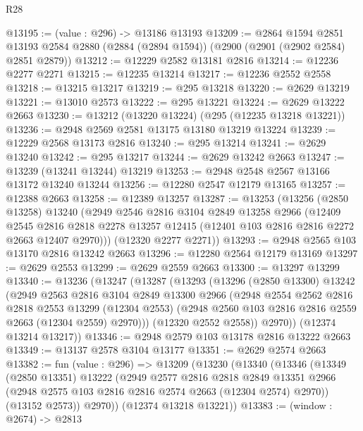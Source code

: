 \begin{lexlean}{R28}
\begin{coremodule}
@13195 := (value : @296) -> @13186 @13193
@13209 := @2864
    @1594
    @2851
    @13193
    @2584
    @2880
    (@2884 (@2894 @1594))
    (@2900 (@2901 (@2902 @2584) @2851 @2879))
@13212 := @12229 @2582 @13181 @2816
@13214 := @12236 @2277 @2271
@13215 := @12235 @13214
@13217 := @12236 @2552 @2558
@13218 := @13215 @13217
@13219 := @295 @13218
@13220 := @2629 @13219
@13221 := @13010 @2573
@13222 := @295 @13221
@13224 := @2629 @13222 @2663
@13230 := @13212 (@13220 @13224) (@295 (@12235 @13218 @13221))
@13236 := @2948 @2569 @2581 @13175 @13180 @13219 @13224
@13239 := @12229 @2568 @13173 @2816
@13240 := @295 @13214
@13241 := @2629 @13240
@13242 := @295 @13217
@13244 := @2629 @13242 @2663
@13247 := @13239 (@13241 @13244) @13219
@13253 := @2948 @2548 @2567 @13166 @13172 @13240 @13244
@13256 := @12280 @2547 @12179 @13165
@13257 := @12388 @2663
@13258 := @12389 @13257
@13287 := @13253
    (@13256
      (@2850 @13258)
      @13240
      (@2949
        @2546
        @2816
        @3104
        @2849
        @13258
        @2966
        (@12409
          @2545
          @2816
          @2818
          @2278
          @13257
          @12415
          (@12401 @103 @2816 @2816 @2272 @2663 @12407 @2970)))
      (@12320 @2277 @2271))
@13293 := @2948 @2565 @103 @13170 @2816 @13242 @2663
@13296 := @12280 @2564 @12179 @13169
@13297 := @2629 @2553
@13299 := @2629 @2559 @2663
@13300 := @13297 @13299
@13340 := @13236
    (@13247
      (@13287
        (@13293
          (@13296
            (@2850 @13300)
            @13242
            (@2949
              @2563
              @2816
              @3104
              @2849
              @13300
              @2966
              (@2948
                @2554
                @2562
                @2816
                @2818
                @2553
                @13299
                (@12304 @2553)
                (@2948 @2560 @103 @2816 @2816 @2559 @2663 (@12304 @2559) @2970)))
            (@12320 @2552 @2558))
          @2970))
      (@12374 @13214 @13217))
@13346 := @2948 @2579 @103 @13178 @2816 @13222 @2663
@13349 := @13137 @2578 @3104 @13177
@13351 := @2629 @2574 @2663
@13382 := fun (value : @296) =>
  @13209
    (@13230
      (@13340
        (@13346
          (@13349
            (@2850 @13351)
            @13222
            (@2949
              @2577
              @2816
              @2818
              @2849
              @13351
              @2966
              (@2948 @2575 @103 @2816 @2816 @2574 @2663 (@12304 @2574) @2970))
            (@13152 @2573))
          @2970))
      (@12374 @13218 @13221))
@13383 := (window : @2674) -> @2813

\end{coremodule}
\end{lexlean}
